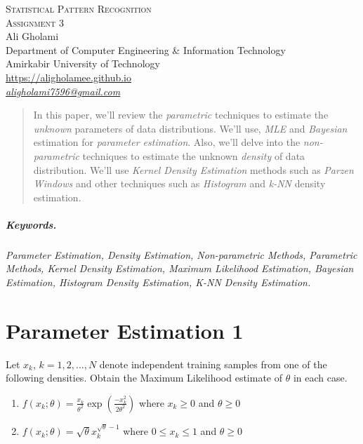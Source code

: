 \documentclass[12pt]{article}
\numberwithin{equation}{section}
\numberwithin{table}{section}
\numberwithin{figure}{section}
\begin{document}

\begin{center}
\textsc{\Large Statistical Pattern Recognition} \\[2pt]
	\textsc{\large Assignment 3}\\
	\vspace{0.5cm}
  Ali Gholami \\[6pt]
  Department of Computer Engineering \& Information Technology\\
  Amirkabir University of Technology  \\[6pt]
  \def\UrlFont{\em}
  \url{https://aligholamee.github.io}\\
    \href{mailto:aligholami7596@gmail.com}{\textit{aligholami7596@gmail.com}}
\end{center}

\begin{abstract}
In this paper, we'll review the \textit{parametric} techniques to estimate the \textit{unknown} parameters of data distributions. We'll use, \textit{MLE} and \textit{Bayesian} estimation for \textit{parameter estimation}. Also, we'll delve into the \textit{non-parametric} techniques to estimate the unknown \textit{density} of data distribution. We'll use \textit{Kernel Density Estimation} methods such as \textit{Parzen Windows} and other techniques such as \textit{Histogram} and \textit{k-NN} density estimation.
\end{abstract}

\subparagraph{Keywords.} \textit{Parameter Estimation, Density Estimation, Non-parametric Methods, Parametric Methods, Kernel Density Estimation, Maximum Likelihood Estimation, Bayesian Estimation, Histogram Density Estimation, K-NN Density Estimation.}

\section{Parameter Estimation 1}
Let ${x_k}$, $k = 1, 2, ..., N$ denote independent training samples from one of the following densities. Obtain the Maximum Likelihood estimate of $\theta$ in each case.
\begin{enumerate}[label=(\alph*)]
	\item $ f(x_k;\theta) = \frac{x_k}{\theta^2}\exp(\frac{-x_k^2}{2\theta^2}) $ where $x_k \geq 0$ and $\theta \ge 0$
	\item $ f(x_k;\theta) = \sqrt{\theta}x_k^{\sqrt{\theta} - 1}$ where $0 \leq x_k \leq 1$ and $ \theta \ge 0$
\end{enumerate}
\end{document}
